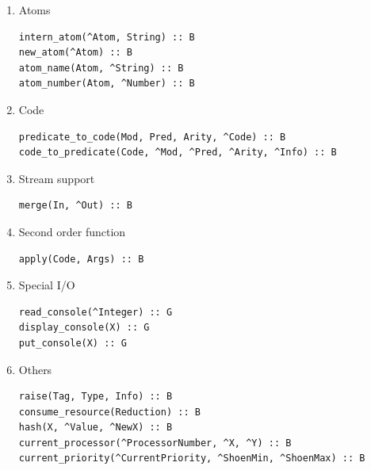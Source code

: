 \begin{enumerate}
\begin{verbatim}
\end{verbatim}
\item Atoms
\begin{verbatim}
intern_atom(^Atom, String) :: B
new_atom(^Atom) :: B
atom_name(Atom, ^String) :: B
atom_number(Atom, ^Number) :: B

\end{verbatim}
\item Code
\begin{verbatim}
predicate_to_code(Mod, Pred, Arity, ^Code) :: B
code_to_predicate(Code, ^Mod, ^Pred, ^Arity, ^Info) :: B

\end{verbatim}
\item Stream support
\begin{verbatim}
merge(In, ^Out) :: B

\end{verbatim}
\item Second order function
\begin{verbatim}
apply(Code, Args) :: B

\end{verbatim}
\item Special I/O
\begin{verbatim}
read_console(^Integer) :: G
display_console(X) :: G
put_console(X) :: G

\end{verbatim}
\item Others
\begin{verbatim}
raise(Tag, Type, Info) :: B
consume_resource(Reduction) :: B
hash(X, ^Value, ^NewX) :: B
current_processor(^ProcessorNumber, ^X, ^Y) :: B
current_priority(^CurrentPriority, ^ShoenMin, ^ShoenMax) :: B

\end{verbatim}
\end{enumerate}

